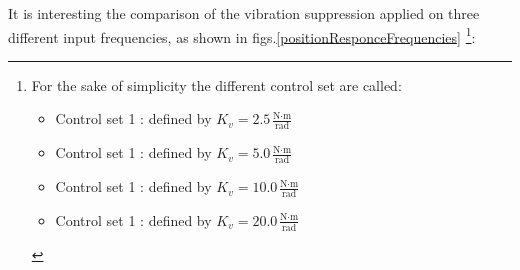 


It is interesting the comparison of the vibration suppression applied on three
different input frequencies, as shown in figs.\ref{positionResponceFrequencies}
\footnote{For the sake of simplicity the different control set are called:
	\begin{itemize}
		\item Control set 1 : defined by $ K_v = 2.5 \frac{\text{N} \cdot \text{m}}{\text{rad}}$
		\item Control set 1 : defined by $ K_v = 5.0 \frac{\text{N} \cdot \text{m}}{\text{rad}}$
		\item Control set 1 : defined by $ K_v = 10.0 \frac{\text{N} \cdot \text{m}}{\text{rad}}$
		\item Control set 1 : defined by $ K_v = 20.0 \frac{\text{N} \cdot \text{m}}{\text{rad}}$	
\end{itemize}
}:

